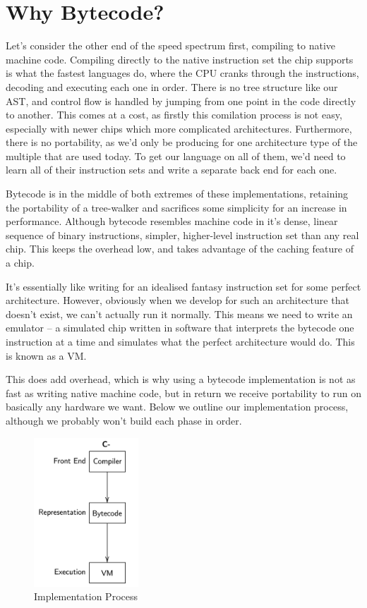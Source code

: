 \section{Why Bytecode?}

Let's consider the other end of the speed spectrum first, compiling to native machine code. Compiling directly to the native instruction set the chip supports is what the fastest languages do, where the CPU cranks through the instructions, decoding and executing each one in order. There is no tree structure like our AST, and control flow is handled by jumping from one point in the code directly to another. This comes at a cost, as firstly this comilation process is not easy, especially with newer chips which more complicated architectures. Furthermore, there is no portability, as we'd only be producing for one architecture type of the multiple that are used today. To get our language on all of them, we'd need to learn all of their instruction sets and write a separate back end for each one.

Bytecode is in the middle of both extremes of these implementations, retaining the portability of a tree-walker and sacrifices some simplicity for an increase in performance. Although bytecode resembles machine code in it's dense, linear sequence of binary instructions, simpler, higher-level instruction set than any real chip. This keeps the overhead low, and takes advantage of the caching feature of a chip. 

It's essentially like writing for an idealised fantasy instruction set for some perfect architecture. However, obviously when we develop for such an architecture that doesn't exist, we can't actually run it normally. This means we need to write an emulator – a simulated chip written in software that interprets the bytecode one instruction at a time and simulates what the perfect architecture would do. This is known as a \ac{VM}.

This does add overhead, which is why using a bytecode implementation is not as fast as writing native machine code, but in return we receive portability to run on basically any hardware we want. Below we outline our implementation process, although we probably won't build each phase in order.


\begin{figure}[h]
\centering
\includegraphics[width=0.35\textwidth]{gfx/process.png}
\caption{Implementation Process}
\end{figure}

